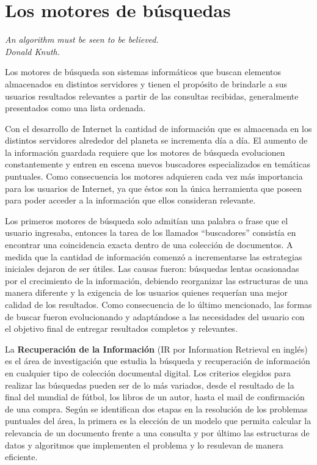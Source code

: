 \section{Los motores de búsquedas}
{\begin{small}%
\begin{flushright}%
\it An algorithm must be seen to be believed.\\Donald Knuth.
\end{flushright}%
\end{small}%
\vspace{.5cm}}
Los motores de búsqueda son sistemas informáticos que buscan elementos almacenados en distintos servidores y tienen el propósito de brindarle a sus usuarios resultados relevantes a partir de las consultas recibidas, generalmente presentados como una lista ordenada.

Con el desarrollo de Internet la cantidad de información que es almacenada en los distintos servidores alrededor del planeta se incrementa día a día. El aumento de la información guardada requiere que los motores de búsqueda evolucionen constantemente y entren en escena nuevos buscadores especializados en temáticas puntuales. Como consecuencia los motores adquieren cada vez más importancia para los usuarios de Internet, ya que éstos son la única herramienta que poseen para poder acceder a la información que ellos consideran relevante.

Los primeros motores de búsqueda solo admitían una palabra o frase que el usuario ingresaba, entonces la tarea de los llamados ``buscadores'' consistía en encontrar una coincidencia exacta dentro de una colección de documentos. A medida que la cantidad de información comenzó a incrementarse las estrategias iniciales dejaron de ser útiles. Las causas fueron: búsquedas lentas ocasionadas por el crecimiento de la información, debiendo reorganizar las estructuras de una manera diferente y la exigencia de los usuarios quienes requerían una mejor calidad de los resultados. Como consecuencia de lo último mencionado, las formas de buscar fueron evolucionando y adaptándose a las necesidades del usuario con el objetivo final de entregar resultados completos y relevantes.

La \textbf{Recuperación de la Información} (IR por Information Retrieval en inglés) \cite{Baeza-Yates:1999:MIR:553876,Manning:2008:IIR:1394399,Zobel:2006:IFT:1132956.1132959} es el área de investigación que estudia la búsqueda y recuperación de información en cualquier tipo de colección documental digital. Los criterios elegidos para realizar las búsquedas pueden ser de lo más variados, desde el resultado de la final del mundial de fútbol, los libros de un autor, hasta el mail de confirmación de una compra. Según \cite{Baeza-Yates:1999:MIR:553876} se identifican dos etapas en la resolución de los problemas puntuales del área, la primera es la elección de un modelo que permita calcular la relevancia de un documento frente a una consulta y por último las estructuras de datos y algoritmos que implementen el problema y lo resulevan de manera eficiente.

